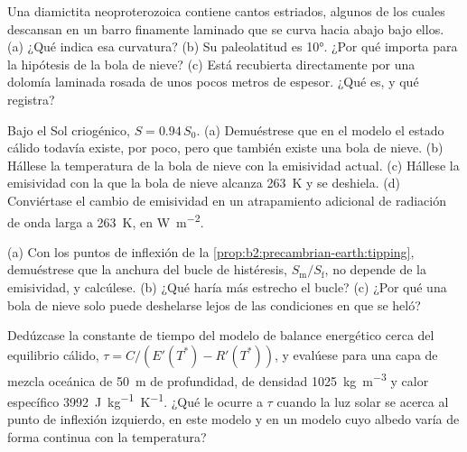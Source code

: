 \begin{exercise}[$\star\star$]\label{exo:b2:precambrian-earth:9}
Una diamictita neoproterozoica contiene cantos estriados, algunos de los cuales descansan en un barro finamente laminado
que se curva hacia abajo bajo ellos. (a) ¿Qué indica esa curvatura? (b) Su paleolatitud es
\ang{10}. ¿Por qué importa para la hipótesis de la bola de nieve? (c) Está recubierta directamente por una
dolomía laminada rosada de unos pocos metros de espesor. ¿Qué es, y qué registra?
\end{exercise}

\begin{exercise}[$\star\star\star$]\label{exo:b2:precambrian-earth:10}
Bajo el Sol criogénico, $S = 0.94\,S_0$. (a) Demuéstrese que en el modelo el estado cálido todavía
existe, por poco, pero que también existe una bola de nieve. (b) Hállese la temperatura de la bola de nieve con la
emisividad actual. (c) Hállese la emisividad con la que la bola de nieve alcanza \qty{263}{K} y
se deshiela. (d) Conviértase el cambio de emisividad en un atrapamiento adicional de radiación de onda larga a
\qty{263}{K}, en \unit{W.m^{-2}}.
\end{exercise}

\begin{exercise}[$\star\star\star$]\label{exo:b2:precambrian-earth:11}
(a) Con los puntos de inflexión de la \cref{prop:b2:precambrian-earth:tipping}, demuéstrese que la anchura
del bucle de histéresis, $S_{\text{m}}/S_{\text{f}}$, no depende de la emisividad, y
calcúlese. (b) ¿Qué haría más estrecho el bucle? (c) ¿Por qué una bola de nieve solo puede deshelarse lejos de
las condiciones en que se heló?
\end{exercise}

\begin{exercise}[$\star\star\star$]\label{exo:b2:precambrian-earth:12}
Dedúzcase la constante de tiempo del modelo de balance energético cerca del equilibrio cálido, $\tau =
C/(E'(T^*) - R'(T^*))$, y evalúese para una capa de mezcla oceánica de \qty{50}{m} de profundidad, de densidad
\qty{1025}{kg.m^{-3}} y calor específico \qty{3992}{J.kg^{-1}.K^{-1}}. ¿Qué le ocurre a $\tau$ cuando la
luz solar se acerca al punto de inflexión izquierdo, en este modelo y en un modelo cuyo albedo varía
de forma continua con la temperatura?
\end{exercise}

